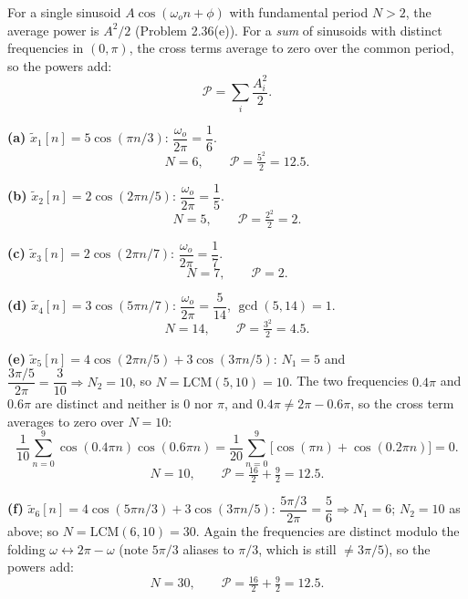 
For a single sinusoid $A\cos(\omega_o n+\phi)$ with fundamental period $N>2$, the average
power is $A^{2}/2$ (Problem 2.36(e)). For a \emph{sum} of sinusoids with distinct
frequencies in $(0,\pi)$, the cross terms average to zero over the common period, so the
powers add:
\[
\mathcal{P}=\sum_i \frac{A_i^{2}}{2}.
\]

\textbf{(a)} $\tilde{x}_1[n]=5\cos(\pi n/3)$: $\dfrac{\omega_o}{2\pi}=\dfrac{1}{6}$.
\[
\boxed{\;N=6,\qquad \mathcal{P}=\tfrac{5^{2}}{2}=12.5 .\;}
\]

\textbf{(b)} $\tilde{x}_2[n]=2\cos(2\pi n/5)$: $\dfrac{\omega_o}{2\pi}=\dfrac15$.
\[
\boxed{\;N=5,\qquad \mathcal{P}=\tfrac{2^{2}}{2}=2 .\;}
\]

\textbf{(c)} $\tilde{x}_3[n]=2\cos(2\pi n/7)$: $\dfrac{\omega_o}{2\pi}=\dfrac17$.
\[
\boxed{\;N=7,\qquad \mathcal{P}=2 .\;}
\]

\textbf{(d)} $\tilde{x}_4[n]=3\cos(5\pi n/7)$: $\dfrac{\omega_o}{2\pi}=\dfrac{5}{14}$,
$\gcd(5,14)=1$.
\[
\boxed{\;N=14,\qquad \mathcal{P}=\tfrac{3^{2}}{2}=4.5 .\;}
\]

\textbf{(e)} $\tilde{x}_5[n]=4\cos(2\pi n/5)+3\cos(3\pi n/5)$:
$N_1=5$ and $\dfrac{3\pi/5}{2\pi}=\dfrac{3}{10}\Rightarrow N_2=10$, so
$N=\mathrm{LCM}(5,10)=10$. The two frequencies $0.4\pi$ and $0.6\pi$ are distinct and
neither is $0$ nor $\pi$, and $0.4\pi\ne 2\pi-0.6\pi$, so the cross term averages to zero
over $N=10$:
\[
\frac{1}{10}\sum_{n=0}^{9}\cos(0.4\pi n)\cos(0.6\pi n)
=\frac{1}{20}\sum_{n=0}^{9}\bigl[\cos(\pi n)+\cos(0.2\pi n)\bigr]=0 .
\]
\[
\boxed{\;N=10,\qquad \mathcal{P}=\tfrac{16}{2}+\tfrac{9}{2}=12.5 .\;}
\]

\textbf{(f)} $\tilde{x}_6[n]=4\cos(5\pi n/3)+3\cos(3\pi n/5)$:
$\dfrac{5\pi/3}{2\pi}=\dfrac{5}{6}\Rightarrow N_1=6$; $N_2=10$ as above; so
$N=\mathrm{LCM}(6,10)=30$. Again the frequencies are distinct modulo the folding
$\omega\leftrightarrow 2\pi-\omega$ (note $5\pi/3$ aliases to $\pi/3$, which is still
$\ne 3\pi/5$), so the powers add:
\[
\boxed{\;N=30,\qquad \mathcal{P}=\tfrac{16}{2}+\tfrac{9}{2}=12.5 .\;}
\]
